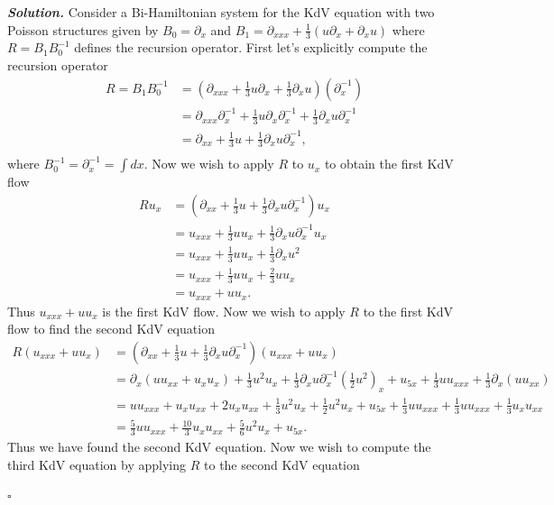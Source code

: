 \documentclass[12pt]{report}
\newenvironment{solution}[1][\it{Solution}]{\textbf{#1. } }{$\square$}
\newcommand{\paren}[1]{{\left(#1\right)}} %
\begin{document}
\begin{solution}
    \noindent
    Consider a Bi-Hamiltonian system for the KdV equation with two Poisson structures given by $B_0 = \partial_x$ and $B_1=\partial_{xxx}+\frac{1}{3}(u\partial_x+\partial_x u)$ where $R = B_1B_0^{-1}$ defines the recursion operator. First let's explicitly compute the recursion operator
    \begin{align*}
        R = B_1B_0^{-1} &= (\partial_{xxx}+\frac{1}{3}u\partial_x+ \frac{1}{3}\partial_x u)(\partial_x^{-1})\\
        &= \partial_{xxx}\partial_x^{-1}+\frac{1}{3}u\partial_x\partial_x^{-1}+ \frac{1}{3}\partial_x u\partial_x^{-1}\\
        &= \partial_{xx}+\frac{1}{3}u+ \frac{1}{3}\partial_x u\partial_x^{-1},\\
    \end{align*} 
    where $B_0^{-1} = \partial_x^{-1} = \int dx.$ Now we wish to apply $R$ to $u_x$ to obtain the first KdV flow
    \begin{align*}
        Ru_x &= (\partial_{xx}+\frac{1}{3}u+ \frac{1}{3}\partial_x u\partial_x^{-1})u_x\\
        &=u_{xxx} + \frac{1}{3}uu_x + \frac{1}{3}\partial_x u \partial_x^{-1}u_x\\
        &=u_{xxx} + \frac{1}{3}uu_x + \frac{1}{3}\partial_x u^2\\
        &=u_{xxx} + \frac{1}{3}uu_x + \frac{2}{3}uu_x\\
        &=u_{xxx} + uu_x.
    \end{align*}
    Thus $u_{xxx} + uu_x$ is the first KdV flow. Now we wish to apply $R$ to the first KdV flow to find the second KdV equation
    \begin{align*}
        R(u_{xxx} + uu_x) &= (\partial_{xx}+\frac{1}{3}u+ \frac{1}{3}\partial_x u\partial_x^{-1})(u_{xxx} + uu_x)\\
        &= \partial_x(uu_{xx} + u_xu_x) + \frac{1}{3}u^2u_x + \frac{1}{3}\partial_x u \partial_x^{-1}\paren{\frac{1}{2}u^2}_x + u_{5x} + \frac{1}{3}uu_{xxx}+ \frac{1}{3}\partial_x(uu_{xx})\\
        &= uu_{xxx} + u_xu_{xx} + 2u_xu_{xx} + \frac{1}{3}u^2u_x + \frac{1}{2}u^2u_x + u_{5x} + \frac{1}{3}uu_{xxx} + \frac{1}{3}uu_{xxx} + \frac{1}{3}u_xu_{xx}\\
        &=\frac{5}{3}uu_{xxx} + \frac{10}{3}u_xu_{xx} + \frac{5}{6}u^2u_x + u_{5x}.
    \end{align*}
    Thus we have found the second KdV equation. Now we wish to compute the third KdV equation by applying $R$ to the second KdV equation

\end{solution}
\end{document}
